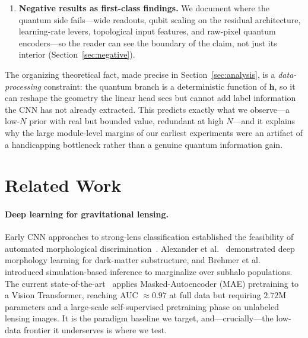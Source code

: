 \documentclass[10pt,letterpaper]{article}
\theoremstyle{plain}
\theoremstyle{definition}
\begin{document}
\begin{enumerate}
        architecture---an ordering that collapses to ENT $\approx$ NOENT once the
        residual bypass removes the bottleneck, localizing the residual benefit to
        amplitude-embedding structure rather than the entangling ring
        (Section~\ref{sec:entanglement}).
  \item \textbf{Negative results as first-class findings.}
        We document where the quantum side fails---wide readouts, qubit scaling
        on the residual architecture, learning-rate levers, topological input
        features, and raw-pixel quantum encoders---so the reader can see the
        boundary of the claim, not just its interior (Section~\ref{sec:negative}).
\end{enumerate}

The organizing theoretical fact, made precise in Section~\ref{sec:analysis}, is a
\emph{data-processing} constraint: the quantum branch is a deterministic function
of $\mathbf{h}$, so it can reshape the geometry the linear head sees but cannot
add label information the CNN has not already extracted. This predicts exactly
what we observe---a low-$N$ prior with real but bounded value, redundant at high
$N$---and it explains why the large module-level margins of our earliest
experiments were an artifact of a handicapping bottleneck rather than a genuine
quantum information gain.

\section{Related Work}
\label{sec:related}

\paragraph{Deep learning for gravitational lensing.}
Early CNN approaches to strong-lens classification established the feasibility of
automated morphological discrimination~\cite{hezaveh2017fast,lanusse2018cmu}.
Alexander et al.~\cite{alexander2020deep} demonstrated deep morphology learning
for dark-matter substructure, and Brehmer et al.~\cite{brehmer2019mining}
introduced simulation-based inference to marginalize over subhalo populations.
The current state-of-the-art~\cite{prasha2025masked} applies Masked-Autoencoder
(MAE) pretraining to a Vision Transformer, reaching AUC ${\approx}0.97$ at full
data but requiring $2.72\mathrm{M}$ parameters and a large-scale self-supervised
pretraining phase on unlabeled lensing images. It is the paradigm baseline we
target, and---crucially---the low-data frontier it underserves is where we test.
\end{document}
